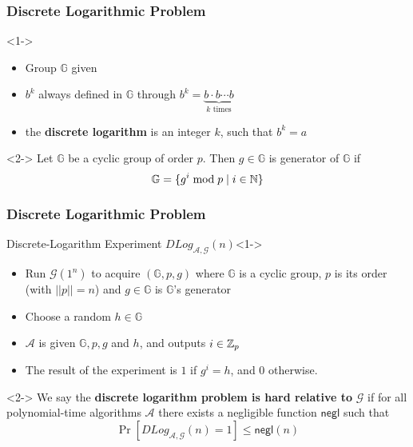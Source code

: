 \begin{frame}
	\frametitle{Discrete Logarithmic Problem}

	\begin{definition}<1->
		\begin{itemize}
			\item Group $\mathbb{G}$ given
			\item $b^k$ always defined in $\mathbb{G}$ through $b^k = \underbrace{b\cdot b \cdots b}_{k\text{ times}}$
			\item the \textbf{discrete logarithm} is an integer $k$, such that $b^k = a$
		\end{itemize}
	\end{definition}
	\begin{definition}<2->
		Let $\mathbb{G}$ be a cyclic group of order $p$. Then $g\in\mathbb{G}$ is generator of $\mathbb{G}$ if
			$$\mathbb{G} = \{g^i \bmod p \mid i \in \mathbb{N} \}$$
	\end{definition}
\end{frame}

\begin{frame}
	\frametitle{Discrete Logarithmic Problem}
	\begin{block}{Discrete-Logarithm Experiment $DLog_{\mathcal{A}, \mathcal{G}}(n)$}<1->
		\begin{itemize}
			\item Run $\mathcal{G}(1^n)$ to acquire $(\mathbb{G}, p, g)$ where $\mathbb{G}$ is a cyclic group, $p$ is its order (with $||p|| = n$) and $g\in \mathbb{G}$ is $\mathbb{G}$'s generator
			\item Choose a random $h\in\mathbb{G}$
			\item $\mathcal{A}$ is given $\mathbb{G}, p, g$ and $h$, and outputs $i\in \mathbb{Z}_p$
			\item The result of the experiment is $1$ if $g^i = h$, and $0$ otherwise.
		\end{itemize}
	\end{block}
	\begin{definition}<2->
		We say the \textbf{discrete logarithm problem is hard relative to} $\mathcal{G}$ if for all polynomial-time algorithms $\mathcal{A}$ there exists a negligible function $\textsf{negl}$ such that 
			$$\Pr[DLog_{\mathcal{A}, \mathcal{G}}(n) = 1] \leq \textsf{negl}(n)$$
	\end{definition}
\end{frame}